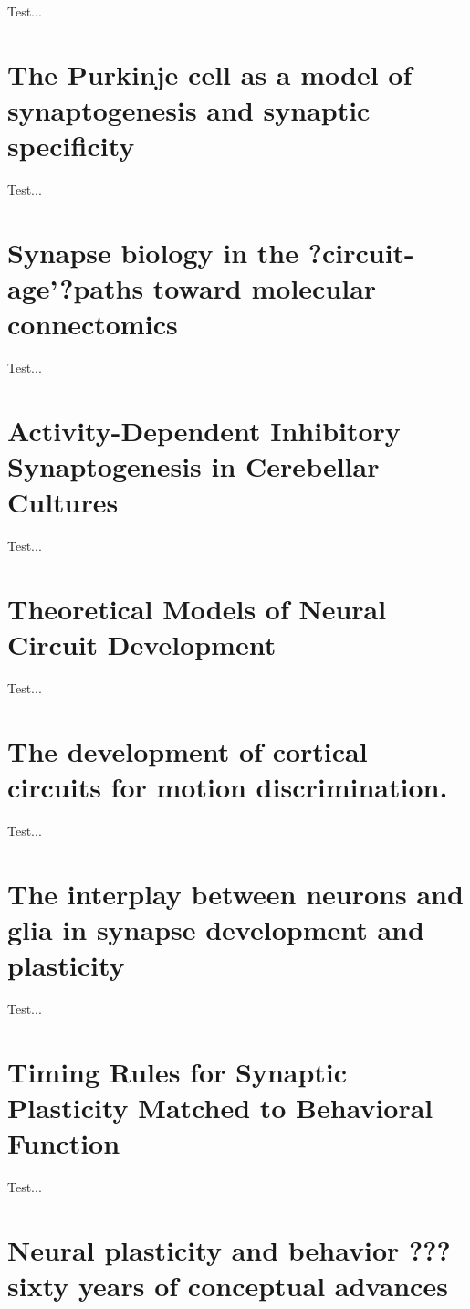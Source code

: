 \documentclass[11pt, a4paper, oneside]{article}   	%
\begin{document}
Test...

\section{The Purkinje cell as a model of synaptogenesis and synaptic specificity \cite{Sasso??-Pognetto2016}}

Test...

\section{Synapse biology in the ?circuit-age'?paths toward molecular connectomics \cite{Schreiner2017}}

Test...

\section{Activity-Dependent Inhibitory Synaptogenesis in Cerebellar Cultures \cite{Seil2016}}

Test...

\section{Theoretical Models of Neural Circuit Development \cite{Simpson2009}}

Test...

\section{The development of cortical circuits for motion discrimination. \cite{Smith2015}}

Test...

\section{The interplay between neurons and glia in synapse development and plasticity \cite{Stogsdill2017}}

Test...

\section{Timing Rules for Synaptic Plasticity Matched to Behavioral Function \cite{Suvrathan2016}}

Test...

\section{Neural plasticity and behavior ??? sixty years of conceptual advances \cite{Sweatt2016}}
\end{document}
